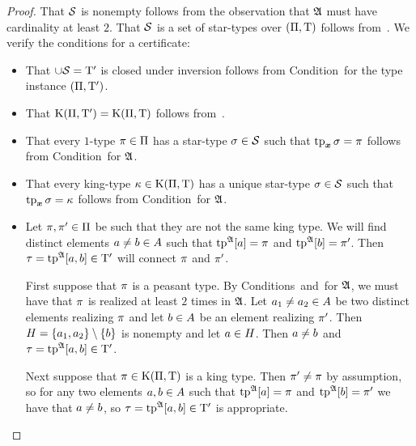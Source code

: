 \begin{proof}
That $\mathcal{S}$ is nonempty follows from the observation that $\mathfrak{A}$ must have
cardinality at least $2$. That $\mathcal{S}$ is a set of star-types over
$(\Pi,\mathrm{T})$ follows from~.
We verify the conditions for a certificate:
\begin{itemize}
  \item[\refcondcerti] 
  That $\cup\mathcal{S} = {\mathrm{T}'}$ is closed under inversion follows from
  Condition~ for the type instance $(\Pi,{\mathrm{T}'})$.
  \item[\refcondcertK]
  That $\mathrm{K}(\Pi,{\mathrm{T}'}) = \mathrm{K}(\Pi,\mathrm{T})$ follows
  from~.
  \item[\refcondcertp]
  That every $1$-type $\pi \in \Pi$ has a star-type $\sigma \in \mathcal{S}$ such
  that $\operatorname{tp}_{\bm{x}}\sigma = \pi$ follows from Condition~ for $\mathfrak{A}$.
  \item[\refcondcertk]
  That every king-type $\kappa \in \mathrm{K}(\Pi,\mathrm{T})$ has a unique star-type
  $\sigma \in \mathcal{S}$ such that $\operatorname{tp}_{\bm{x}}\sigma = \kappa$ follows from
  Condition~ for $\mathfrak{A}$.
  \item[\refcondcertc]
  Let $\pi, {\pi'} \in \Pi$ be such that they are not the same king type.
  We will find distinct elements $a \neq b \in A$ such that
  $\operatorname{tp}^{\mathfrak{A}}[a] = \pi$ and $\operatorname{tp}^{\mathfrak{A}}[b] = {\pi'}$. Then $\tau =
  \operatorname{tp}^{\mathfrak{A}}[a,b] \in {\mathrm{T}'}$ will connect $\pi$ and ${\pi'}$.
  
  First suppose that $\pi$ is a peasant type. By
  Conditions~ and~ for $\mathfrak{A}$, we must have that
  $\pi$ is realized at least $2$ times in $\mathfrak{A}$. Let $a_1 \neq a_2 \in
  A$ be two distinct elements realizing $\pi$ and let $b \in A$ be
  an element realizing ${\pi'}$. Then $H = \left\{a_1,a_2\right\} \setminus \left\{b\right\}$ is
  nonempty and let $a \in H$. Then $a \neq b$ and $\tau =
  \operatorname{tp}^{\mathfrak{A}}[a,b] \in {\mathrm{T}'}$.
  
  Next suppose that $\pi \in \mathrm{K}(\Pi,\mathrm{T})$ is a king type. Then ${\pi'}
  \neq \pi$ by assumption, so for any two elements $a, b \in A$ such
  that $\operatorname{tp}^{\mathfrak{A}}[a] = \pi$ and $\operatorname{tp}^{\mathfrak{A}}[b] = {\pi'}$ we have that $a
  \neq b$, so $\tau = \operatorname{tp}^{\mathfrak{A}}[a,b] \in {\mathrm{T}'}$ is appropriate.
\end{itemize}
\end{proof}

